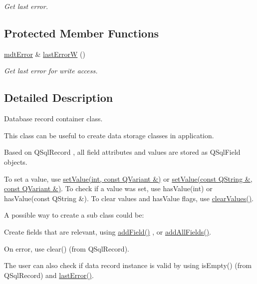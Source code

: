 \begin{DoxyCompactItemize}
\begin{DoxyCompactList}\small\item\em Get last error. \end{DoxyCompactList}\end{DoxyCompactItemize}
\subsection*{Protected Member Functions}
\begin{DoxyCompactItemize}
\item 
\hyperlink{classmdt_error}{mdtError} \& \hyperlink{classmdt_sql_record_a9a930216441a3a1234c3f2774d17eb11}{lastErrorW} ()
\begin{DoxyCompactList}\small\item\em Get last error for write access. \end{DoxyCompactList}\end{DoxyCompactItemize}


\subsection{Detailed Description}
Database record container class. 

This class can be useful to create data storage classes in application.

Based on QSqlRecord , all field attributes and values are stored as QSqlField objects.

To set a value, use \hyperlink{classmdt_sql_record_a330291ff82fb8c7803c47d30f8939ed5}{setValue(int, const QVariant \&)} or \hyperlink{classmdt_sql_record_a8bcaf65b449b6c82548735cdccb8cff1}{setValue(const QString \&, const QVariant \&)}. To check if a value was set, use hasValue(int) or hasValue(const QString \&). To clear values and hasValue flags, use \hyperlink{classmdt_sql_record_a0bfc0fc265c6b0048698e2f5d4f840a8}{clearValues()}.

A possible way to create a sub class could be:
\begin{DoxyItemize}
\item Create fields that are relevant, using \hyperlink{classmdt_sql_record_a7b144e9c00e46748e1729251aabd5f51}{addField()} , or \hyperlink{classmdt_sql_record_a878c551b98df2653d642ec01b0101495}{addAllFields()}.
\item On error, use clear() (from QSqlRecord).
\item The user can also check if data record instance is valid by using isEmpty() (from QSqlRecord) and \hyperlink{classmdt_sql_record_aa997bbc32402c3a254404ab74b9662f0}{lastError()}.
\end{DoxyItemize}

